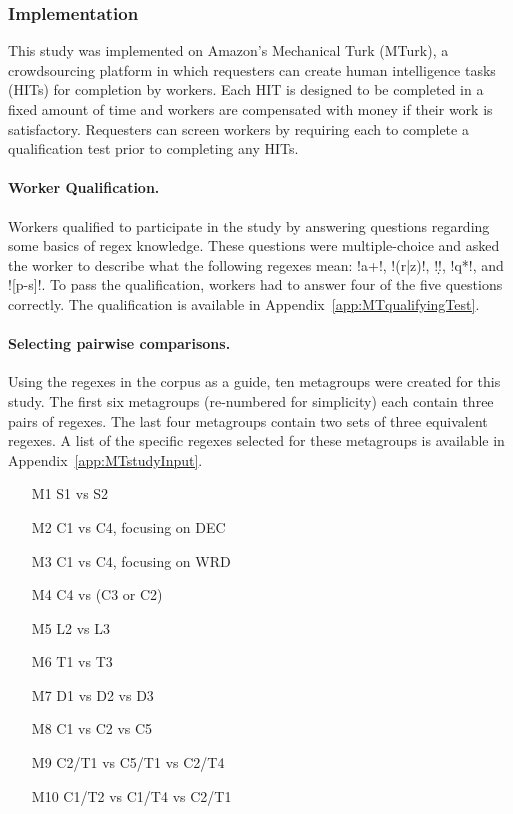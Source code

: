 \subsubsection{Implementation}
This study was implemented on Amazon's Mechanical Turk (MTurk),  a crowdsourcing platform in which requesters can create human intelligence tasks (HITs) for completion by workers. Each HIT is designed to be completed in a fixed amount of time and workers are compensated with money if their work is satisfactory. Requesters can screen workers by requiring each to complete a qualification test prior to completing any HITs.

\paragraph{Worker Qualification.} Workers qualified to participate in the study by answering questions regarding some basics of regex knowledge. These questions were multiple-choice and asked the worker to describe what the following regexes mean: \cverb!a+!, \cverb!(r|z)!, \cverb!\d!, \cverb!q*!, and \cverb![p-s]!. To pass the qualification, workers had to answer four of the five questions correctly.  The qualification is available in Appendix~\ref{app:MTqualifyingTest}.

\paragraph{Selecting pairwise comparisons.}  Using the regexes in the corpus as a guide, ten metagroups were created for this study.  The first six metagroups (re-numbered for simplicity) each contain three pairs of regexes.  The last four metagroups contain two sets of three equivalent regexes.  A list of the specific regexes selected for these metagroups is available in Appendix~\ref{app:MTstudyInput}.

\begin{multicols}{2}
\begin{itemize}[noitemsep,topsep=0pt]
\item[M1]  S1 vs S2
\item[M2]  C1 vs C4, focusing on DEC
\item[M3]  C1 vs C4, focusing on WRD
\item[M4]  C4 vs (C3 or C2)
\item[M5]  L2 vs L3
\item[M6]  T1 vs T3
\item[M7]  D1 vs D2 vs D3
\item[M8]  C1 vs C2 vs C5
\item[M9]  C2/T1 vs C5/T1 vs C2/T4
\item[M10] C1/T2 vs C1/T4 vs C2/T1
\end{itemize}
\end{multicols}

